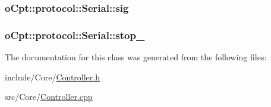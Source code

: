 \subsubsection[{\texorpdfstring{sig}{sig}}]{ o\+Cpt\+::protocol\+::\+Serial\+::sig}\hypertarget{classo_cpt_1_1protocol_1_1_serial_a363071a4e7ead980f7f3369f57acf578}{}\label{classo_cpt_1_1protocol_1_1_serial_a363071a4e7ead980f7f3369f57acf578}
\subsubsection[{\texorpdfstring{stop\+\_\+}{stop_}}]{ o\+Cpt\+::protocol\+::\+Serial\+::stop\+\_\+\hspace{0.3cm}{\ttfamily [protected]}}\hypertarget{classo_cpt_1_1protocol_1_1_serial_a0905cfeb2f2e21ce6a141e068813f75c}{}\label{classo_cpt_1_1protocol_1_1_serial_a0905cfeb2f2e21ce6a141e068813f75c}


The documentation for this class was generated from the following files\+:\begin{DoxyCompactItemize}
\item 
include/\+Core/\hyperlink{_controller_8h}{Controller.\+h}\item 
src/\+Core/\hyperlink{_controller_8cpp}{Controller.\+cpp}\end{DoxyCompactItemize}
